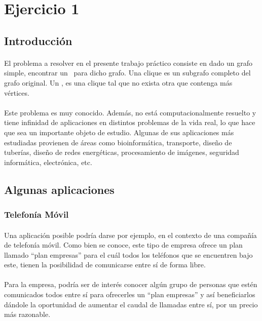 \section{Ejercicio 1}
\subsection{Introducción}

\paragraph{}
El problema a resolver en el presente trabajo práctico consiste en dado un grafo simple, encontrar un \mc \ para dicho grafo. Una clique es un subgrafo completo del grafo original. Un \mc, es una clique tal que no exista otra que contenga más vértices.

\paragraph{}
Este problema es muy conocido. Además, no está computacionalmente resuelto  y tiene infinidad de aplicaciones en distintos problemas de la vida real, lo que hace que sea un importante objeto de estudio. Algunas de sus aplicaciones más estudiadas provienen de áreas como bioinformática, transporte, diseño de tuberías, diseño de redes energéticas, procesamiento de imágenes, seguridad informática, electrónica, etc.

\subsection{Algunas aplicaciones}
\subsubsection{Telefonía Móvil}

\paragraph{}
Una aplicación posible podría darse por ejemplo, en el contexto de una compañía de telefonía móvil. Como bien se conoce, este tipo de empresa ofrece un plan llamado ``plan empresas'' para el cuál todos los teléfonos que se encuentren bajo este, tienen la posibilidad de comunicarse entre sí de forma libre.

\paragraph{}
Para la empresa, podría ser de interés conocer algún grupo de personas que estén comunicados todos entre sí para ofrecerles un ``plan empresas'' y así beneficiarlos dándole la oportunidad de aumentar el caudal de llamadas entre sí, por un precio más razonable.

